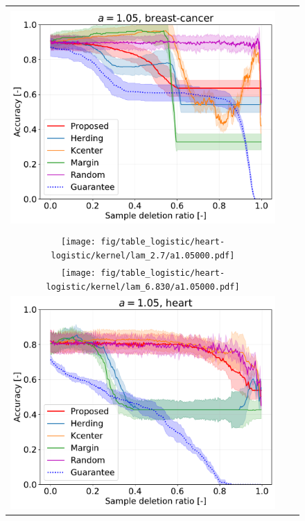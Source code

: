 \begin{figure}[h]
\begin{tabular}{ccc}
		&
		\begin{minipage}[b]{0.3\hsize}\centering {\small Dataset: breast-cancer, $\lambda=n$}\\\includegraphics[width=0.8\hsize]{fig/table_logistic/breast-cancer-logistic/kernel/lam_546/a1.05000.pdf}\end{minipage}
		\\
		\begin{minipage}[b]{0.3\hsize}\centering {\small Dataset: heart, $\lambda=\lambda_\mathrm{best}$}\\\texttt{[image: fig/table\_logistic/heart-logistic/kernel/lam\_2.7/a1.05000.pdf]}\end{minipage}
		&
		\begin{minipage}[b]{0.3\hsize}\centering {\small Dataset: heart, $\lambda=n \cdot 10^{-1.5}$}\\\texttt{[image: fig/table\_logistic/heart-logistic/kernel/lam\_6.830/a1.05000.pdf]}\end{minipage}
		&
		\begin{minipage}[b]{0.3\hsize}\centering {\small Dataset: heart, $\lambda=n$}\\\includegraphics[width=0.8\hsize]{fig/table_logistic/heart-logistic/kernel/lam_216/a1.05000.pdf}\end{minipage}

\end{tabular}
\end{figure}
